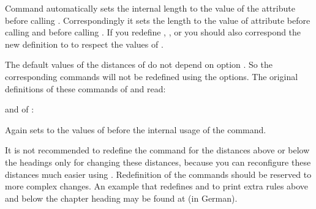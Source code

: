 Command  automatically sets the internal length
 to the value of the
 attribute
 before calling
. Correspondingly it sets the length to the value
of attribute  before calling  and
 before calling . If you redefine
, , or
 you should also correspond the new definition to
 to respect the values of .

The default values of the distances of  do not depend on option
. So the corresponding commands will not be redefined using
the options. The original definitions of these commands of 
and  read:
\begin{lstcode}
  \newcommand*{\partheadstartvskip}{%
    \null\vskip-\baselineskip\vskip\@tempskipa
  }
  \newcommand*{\partheadmidvskip}{%
    \par\nobreak
    \vskip\@tempskipa
  }
  \newcommand*{\partheadendvskip}{%
    \vskip\@tempskipa\newpage
  }
\end{lstcode}
and of :
\begin{lstcode}
  \newcommand*{\partheadstartvskip}{%
    \addvspace{\@tempskipa}%
  }
  \newcommand*{\partheadmidvskip}{%
    \par\nobreak
  }
  \newcommand*{\partheadendvskip}{%
    \vskip\@tempskipa
  }
\end{lstcode}
Again  sets
 to the values of
before the internal usage of the command.

It is not recommended to redefine the command for the
distances above or below the headings only for changing these distances,
because you can reconfigure these distances much easier using
. Redefinition of the commands
should be reserved to more complex changes. An  example
that redefines  and 
to print extra rules above and below the chapter heading may be found at
\cite{homepage} (in German).%
%
\EndIndexGroup


